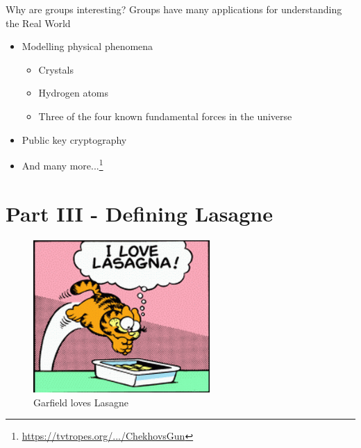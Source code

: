 \documentclass{beamer}
\begin{document}
\begin{frame}{Why are groups interesting?}
    Groups have many applications for understanding the Real World\texttrademark
    \begin{itemize}
        \item Modelling physical phenomena
        \begin{itemize}
            \item Crystals
            \item Hydrogen atoms
            \item Three of the four known fundamental forces in the universe
        \end{itemize}
        \item Public key cryptography
        \item And many more...\footnote{\href{https://tvtropes.org/pmwiki/pmwiki.php/Main/ChekhovsGun}{https://tvtropes.org/.../ChekhovsGun}}
    \end{itemize}
\end{frame}


\section{Part III - Defining Lasagne}


\begin{frame}
    \begin{figure}
        \includegraphics[width=0.6\textwidth]{Garfield_Loves_Lasagna.png}
        \caption{\label{fig:garfield-loves-lasagne}Garfield loves Lasagne \cite{garfield_lasagna}}
    \end{figure}
\end{frame}
\end{document}
